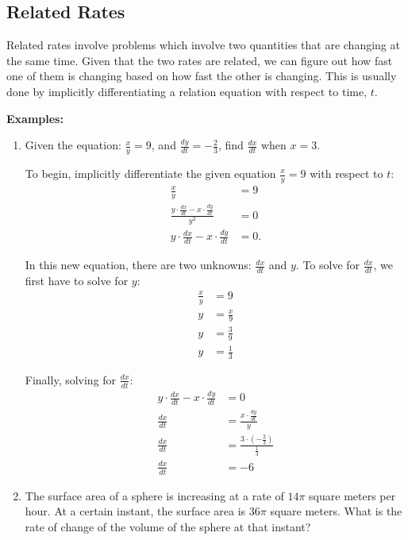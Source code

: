 \subsection{Related Rates}
Related rates involve problems which involve two quantities that are changing at the same time. Given that the two rates are related, we can figure out how fast one of them is changing based on how fast the other is changing. This is usually done by implicitly differentiating a relation equation with respect to time, $t$.

\noindent \textbf{Examples:}
\begin{enumerate}
	\item Given the equation: $\frac{x}{y} = 9$, and $\frac{dy}{dt} = -\frac{2}{3}$, find $\frac{dx}{dt}$ when $x = 3$.

	To begin, implicitly differentiate the given equation $\frac{x}{y} = 9$ with respect to $t$:
	\begin{align*}
		\frac{x}{y} &= 9 \\[5pt]
		\frac{y \cdot \frac{dx}{dt} - x \cdot \frac{dy}{dt}}{y^2} &= 0 \\[5pt]
		y \cdot \frac{dx}{dt} - x \cdot \frac{dy}{dt} &= 0.
	\end{align*}

	In this new equation, there are two unknowns: $\frac{dx}{dt}$ and $y$. To solve for $\frac{dx}{dt}$, we first have to solve for $y$:
	\begin{align*}
		\frac{x}{y} &= 9 \\[5pt]
		y &= \frac{x}{9} \\[5pt]
		y &= \frac{3}{9} \\[5pt]
		y &= \frac{1}{3}
	\end{align*}

	Finally, solving for $\frac{dx}{dt}$:
	\begin{align*}
		y \cdot \frac{dx}{dt} - x \cdot \frac{dy}{dt} &= 0 \\[5pt]
		\frac{dx}{dt} &= \frac{x \cdot \frac{dy}{dt}}{y} \\[5pt]
		\frac{dx}{dt} &= \frac{3 \cdot \left( -\frac{2}{3} \right)}{\frac{1}{3}} \\[5pt]
		\frac{dx}{dt} &= -6
	\end{align*}

	\item The surface area of a sphere is increasing at a rate of $14 \pi$ square meters per hour. At a certain instant, the surface area is $36 \pi$ square meters. What is the rate of change of the volume of the sphere at that instant?


\end{enumerate}
